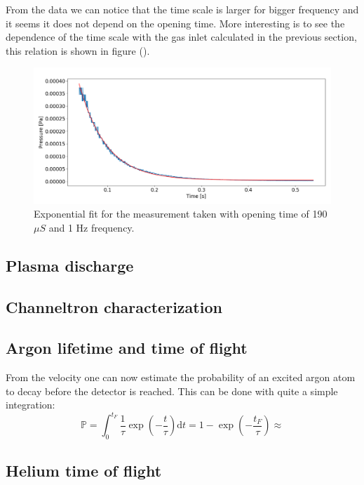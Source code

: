 \documentclass[a4paper,10pt]{article}
\begin{document}
From the data we can notice that the time scale is larger for bigger frequency and it seems it does not depend on the opening time. More interesting is to see the dependence of the time scale with the gas inlet calculated in the previous section, this relation is shown in figure (). 

\begin{figure}[H]
\centering
\includegraphics[width = \textwidth]{expfit}
\caption{Exponential fit for the measurement taken with opening time of 190 $\mu S$ and 1 Hz frequency.}\label{expfit}
\end{figure}

\subsection{Plasma discharge}

\subsection{Channeltron characterization}

\subsection{Argon lifetime and time of flight}
From the velocity one can now estimate the probability of an excited argon atom to decay before the detector is reached. This can be done with quite a simple integration:
\begin{equation}
	\mathbb{P} = \int_0^{t_F} \frac{1}{\tau} \exp(-\frac{t}{\tau}) \mathrm{d}t = 1 - \exp(-\frac{t_F}{\tau}) \approx 
\end{equation}
\subsection{Helium time of flight}
\end{document}
